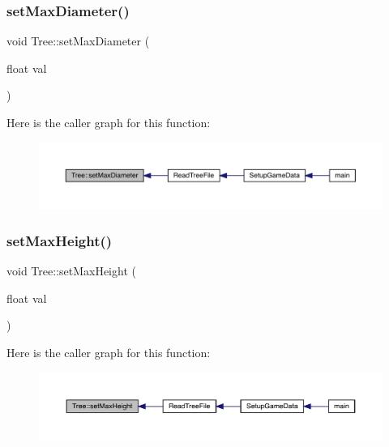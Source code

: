 \subsubsection{\texorpdfstring{set\+Max\+Diameter()}{setMaxDiameter()}}
{\footnotesize\ttfamily void Tree\+::set\+Max\+Diameter (\begin{DoxyParamCaption}\item[{float}]{val }\end{DoxyParamCaption})}

Here is the caller graph for this function\+:
\nopagebreak
\begin{figure}[H]
\begin{center}
\leavevmode
\includegraphics[width=350pt]{dd/df8/class_tree_a4073a7cc0b9b3388db7bff4491e96e72_icgraph}
\end{center}
\end{figure}
\mbox{\label{class_tree_afb29372db5251e9355aedd129e5d9a49}} 
\subsubsection{\texorpdfstring{set\+Max\+Height()}{setMaxHeight()}}
{\footnotesize\ttfamily void Tree\+::set\+Max\+Height (\begin{DoxyParamCaption}\item[{float}]{val }\end{DoxyParamCaption})}

Here is the caller graph for this function\+:
\nopagebreak
\begin{figure}[H]
\begin{center}
\leavevmode
\includegraphics[width=350pt]{dd/df8/class_tree_afb29372db5251e9355aedd129e5d9a49_icgraph}
\end{center}
\end{figure}



